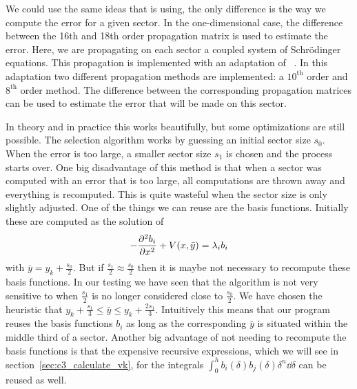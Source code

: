 We could use the same ideas that \matslise{} is using, the only difference is the way we compute the error for a given sector. In the one-dimensional case, the difference between the 16th and 18th order propagation matrix is used to estimate the error. Here, we are propagating on each sector a coupled system of Schrödinger equations. This propagation is implemented with an adaptation of \matscs{}~\cite{ledoux_numerical_2007}. In this adaptation two different propagation methods are implemented: a $10^\text{th}$ order and $8^\text{th}$ order method. The difference between the corresponding propagation matrices can be used to estimate the error that will be made on this sector.

In theory and in practice this works beautifully, but some optimizations are still possible. The selection algorithm works by guessing an initial sector size $s_0$. When the error is too large, a smaller sector size $s_1$ is chosen and the process starts over. One big disadvantage of this method is that when a sector was computed with an error that is too large, all computations are thrown away and everything is recomputed. This is quite wasteful when the sector size is only slightly adjusted. One of the things we can reuse are the basis functions. Initially these are computed as the solution of
$$
  -\pdv[2]{b_i}{x} + V(x, \bar{y}) = \lambda_i b_i
$$
with $\bar{y} = y_{k} + \frac{s_0}{2}$. But if $\frac{s_1}{2} \approx \frac{s_0}{2}$ then it is maybe not necessary to recompute these basis functions. In our testing we have seen that the algorithm is not very sensitive to when $\frac{s_1}{2}$ is no longer considered close to $\frac{s_0}{2}$. We have chosen the heuristic that $y_k + \frac{s_1}{3} \leq \bar{y} \leq y_k + \frac{2 s_1}{3}$. Intuitively this means that our program reuses the basis functions $b_i$ as long as the corresponding $\bar{y}$ is situated within the middle third of a sector. Another big advantage of not needing to recompute the basis functions is that the expensive recursive expressions, which we will see in section~\ref{sec:c3_calculate_vk}, for the integrals $\int_{0}^{h} b_i(\delta)b_j(\delta)\delta^n \dd \delta $ can be reused as well.

